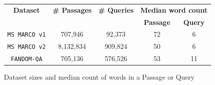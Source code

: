 \documentclass[11pt]{article}
\begin{document}
\begin{figure}
    \centering
    \caption{Dataset sizes and median count of words in a Passage or Query}
    \label{table1}
    \setlength{\tabcolsep}{4pt} %
    \begin{tabular}{ccccc}
    \hline
    \textbf{Dataset} & \textbf{\# Passages} & \textbf{\# Queries} & \multicolumn{2}{c}{\textbf{Median word count}} \\
    & & & \textbf{Passage} & \textbf{Query} \\
    \hline

    \texttt{MS MARCO v1} & 707,946 & 92,373 & 72 & 6 \\
    \texttt{MS MARCO v2} & 8,132,834 & 909,824 & 50 & 6 \\
    \hline
    \texttt{FANDOM-QA} & 705,136 & 576,526 & 53 & 11 \\
    \hline
    \end{tabular}
\end{figure}
\end{document}
